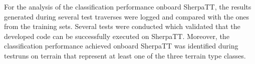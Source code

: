 \documentclass{article}
\begin{document}
For the analysis of the classification performance onboard SherpaTT, the results generated during several test traverses were logged and compared with the ones from the training sets.
Several tests were conducted which validated that the developed code can be successfully executed on SherpaTT.
Moreover, the classification performance achieved onboard SherpaTT was identified during testruns on terrain that represent at least one of the three terrain type classes.

\nocite{*}


\end{document}
